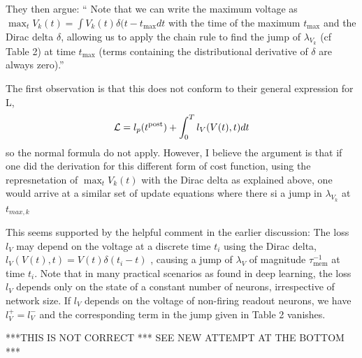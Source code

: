 \documentclass[a4paper]{article}
\newcommand{\blue}[1]{{\color{blue}#1}}
\begin{document}
They then argue: \blue{`` Note that we can write the maximum voltage as $\max_t V_k(t) = \int V_k(t) \delta(t-t_{\text{max}} dt$ with the time of the maximum $t_{\text{max}}$ and the Dirac delta $\delta$, allowing us to apply the chain rule to find the jump of $\lambda_{V_k}$ (cf Table 2) at time $t_{\text{max}}$ (terms containing the distributional derivative of $\delta$ are always zero).''}

The first observation is that this does not conform to their general expression for {\cal L},
\begin{align}
  {\cal L} = l_p(t^{\text{post}}) + \int_0^T l_V(V(t),t) dt
\end{align}
so the normal formula do not apply. However, I believe the argument is that if one did the derivation for this different form of cost function, using the represnetation of $\max_t V_k(t)$ with the Dirac delta as explained above, one would arrive at a similar set of update equations where there si a jump in $\lambda_{V_k}$ at $t_{max,k}$ 

This seems supported by the helpful comment in the earlier discussion: \blue{The loss $l_V$ may depend on the voltage at a discrete time $t_i$ using the Dirac delta,
$l_V (V(t), t) = V(t) \delta(t_i − t)$ , causing a jump of $\lambda_V$ of magnitude $\tau_{\text{mem}}^{-1}$ at time $t_i$. Note that in many practical
scenarios as found in deep learning, the loss $l_V$ depends only on the state of a constant number of neurons, irrespective of network size. If $l_V$ depends on the voltage of non-firing readout neurons, we have $ l^+_V = l^−_V$ and the corresponding term in the jump given in Table 2 vanishes.}


***THIS IS NOT CORRECT *** SEE NEW ATTEMPT AT THE BOTTOM ***
\end{document}
